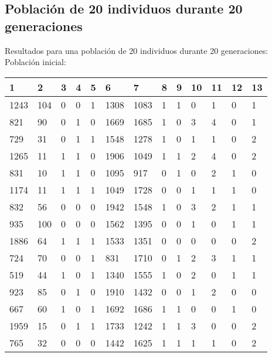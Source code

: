 \subsection{Población de 20 individuos durante 20 generaciones}
Resultados para una población de 20 individuos durante 20 generaciones:
Población inicial:
\begin{table}[H]
\begin{tabular}{|l|l|l|l|l|l|l|l|l|l|l|l|l|}
\hline
\textbf{1} & \textbf{2} & \textbf{3} & \textbf{4} & \textbf{5} & \textbf{6} & \textbf{7} & \textbf{8} & \textbf{9} & \textbf{10} & \textbf{11} & \textbf{12} & \textbf{13} \\ \hline
1243  &  104  &  0  &  0  &  1  &  1308  &  1083  &  1  &  1  &  0  &  1  &  0  &  1 \\ \hline
821  &  90  &  0  &  1  &  0  &  1669  &  1685  &  1  &  0  &  3  &  {\color[HTML]{FE0000}4}  &  0  &  1 \\ \hline
729  &  31  &  0  &  1  &  1  &  1548  &  1278  &  1  &  0  &  1  &  1  &  0  &  2 \\ \hline
1265  &  11  &  1  &  1  &  0  &  1906  &  1049  &  1  &  1  &  2  &  {\color[HTML]{FE0000}4}  &  0  &  2 \\ \hline
831  &  10  &  1  &  1  &  0  &  1095  &  917  &  0  &  1  &  0  &  2  &  1  &  0 \\ \hline
1174  &  11  &  1  &  1  &  1  &  1049  &  1728  &  0  &  0  &  1  &  1  &  1  &  0 \\ \hline
832  &  56  &  0  &  0  &  0  &  1942  &  1548  &  1  &  0  &  3  &  2  &  1  &  1 \\ \hline
935  &  100  &  0  &  0  &  0  &  1562  &  1395  &  0  &  0  &  1  &  0  &  1  &  1 \\ \hline
1886  &  64  &  1  &  1  &  1  &  1533  &  1351  &  0  &  0  &  0  &  0  &  0  &  2 \\ \hline
724  &  70  &  0  &  0  &  1  &  831  &  1710  &  0  &  1  &  2  &  3  &  1  &  1 \\ \hline
519  &  44  &  1  &  0  &  1  &  1340  &  1555  &  1  &  0  &  2  &  0  &  1  &  1 \\ \hline
923  &  85  &  0  &  1  &  0  &  1910  &  1432  &  0  &  0  &  1  &  2  &  0  &  0 \\ \hline
667  &  60  &  1  &  0  &  1  &  1692  &  1686  &  1  &  1  &  0  &  0  &  1  &  0 \\ \hline
1959  &  15  &  0  &  1  &  1  &  1733  &  1242  &  1  &  1  &  3  &  0  &  0  &  2 \\ \hline
765  &  32  &  0  &  0  &  0  &  1442  &  1625  &  1  &  1  &  1  &  1  &  0  &  2 \\ \hline

\end{tabular}
\end{table}
